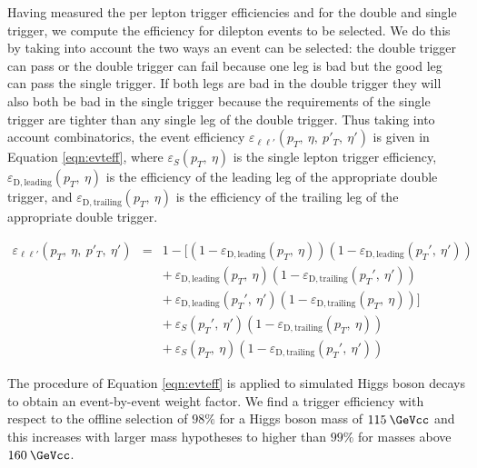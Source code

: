 


Having measured the per lepton trigger efficiencies 
and for the double and single trigger,
we compute the efficiency for dilepton events to be selected.
We do this by taking into account the two ways an event can be selected: 
the double trigger can pass or the double trigger can fail because one leg is bad
but the good leg can pass the single trigger.
If both legs are bad in the double trigger they will also both be bad in the single trigger
because the requirements of the single trigger are tighter than any single leg of the double trigger.
Thus taking into account combinatorics, the event efficiency $\varepsilon_{\ell\ell'}(p_T,\:\eta,\:p'_T,\:\eta')$
is given in Equation \ref{eqn:evteff}, where $\varepsilon_{S}(p_T,\:\eta)$ is the single 
lepton trigger efficiency,
$\varepsilon_{\mathrm{D,leading}}(p_T,\:\eta)$ is the efficiency of the leading leg of the 
appropriate double trigger, and $\varepsilon_{\mathrm{D,trailing}}(p_T,\:\eta)$ is the 
efficiency of the trailing leg of the appropriate double trigger.

\begin{eqnarray}
\label{eqn:evteff}
\varepsilon_{\ell\ell'}(p_T,\:\eta,\:p'_T,\:\eta') & = & 1 - [(1-\varepsilon_{\mathrm{D,leading}}(p_T,\:\eta))(1-\varepsilon_{\mathrm{D,leading}}(p_T',\:\eta')) \\
               &   & +~\varepsilon_{\mathrm{D,leading}}(p_T,\:\eta)(1-\varepsilon_{\mathrm{D,trailing}}(p_T',\:\eta')) \\
               &   & +~\varepsilon_{\mathrm{D,leading}}(p_T',\:\eta')(1-\varepsilon_{\mathrm{D,trailing}}(p_T,\:\eta))] \\
               &   & +~\varepsilon_{S}(p_T',\:\eta')(1-\varepsilon_{\mathrm{D,trailing}}(p_T,\:\eta)) \nonumber\\
               &   & +~\varepsilon_{S}(p_T,\:\eta)(1-\varepsilon_{\mathrm{D,trailing}}(p_T',\:\eta'))
\end{eqnarray}

The procedure of Equation \ref{eqn:evteff} is applied to simulated Higgs boson decays to obtain an event-by-event weight factor. We find a 
trigger efficiency with respect to the offline selection of $98\%$ for a Higgs boson mass of $115\:\GeVcc$ and this increases with larger
mass hypotheses to higher than $99\%$ for masses above $160\:\GeVcc$.

